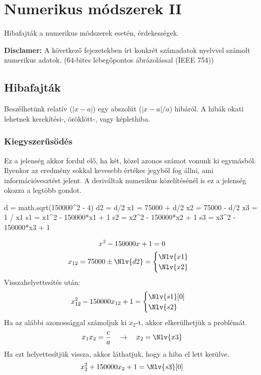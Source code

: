 \documentclass[../../main.tex]{subfiles}
\begin{document}
\section{Numerikus módszerek II}

\begin{fulltheorem}
  Hibafajták a numerikus módszerek esetén, érdekességek.
\end{fulltheorem}

{\color{red}\textbf{Disclamer:}} A következő fejezetekben írt konkrét számadatok
 nyelvvel számolt numerikus adatok.
(64-bites lebegőpontos ábrázolással (IEEE 754))

\subsection{Hibafajták}

Beszélhetünk relatív ($|x - a|$) egy abszolút ($|x - a| / a$) hibáról.
A hibák okati lehetnek kerekítési-, öröklött-, vagy képlethiba.

\subsubsection{Kiegyszerűsödés}

Ez a jelenség akkor fordul elő, ha két, közel azonos számot vonunk ki egymásból.
Ilyenkor az eredmény sokkal kevesebb értékes jegyből fog állni, ami
információvesztést jelent. A deriváltak numerikus közelítésénél is ez a
jelenség okozza a legtöbb gondot.
\begin{luacode*}
  d = math.sqrt(150000^2 - 4)
  d2 = d/2
  x1 = 75000 + d/2
  x2 = 75000 - d/2
  x3 = 1 / x1
  s1 = x1^2 - 150000*x1 + 1
  s2 = x2^2 - 150000*x2 + 1
  s3 = x3^2 - 150000*x3 + 1
\end{luacode*}
\begin{gather*}
  x^2  - 150000 x + 1 = 0 \\
  x_{12} = 75000 \pm \Nlv{d2} = \begin{cases}
    \Nlv{x1} \\
    \Nlv{x2}
  \end{cases}
\end{gather*}
Visszahelyettesítés után:
\[
  x_{12}^2 - 150000 x_{12} + 1 = \begin{cases}
    \Nlv{s1}[0] \\
    \Nlv{s2}
  \end{cases}
\]
Ha az alábbi azonossággal számoljuk ki $x_2$-t, akkor elkerülhetjük a problémát.
\[
  x_1 x_2 = \frac{c}{a}
  \quad \rightarrow \quad
  x_2 = \Nlv{x3}
\]
Ha ezt helyettesítjük vissza, akkor láthatjuk, hogy a hiba el lett kerülve.
\[
  x_2^2 + 150000 x_2 + 1 = \Nlv{s3}[0]
\]
\end{document}
